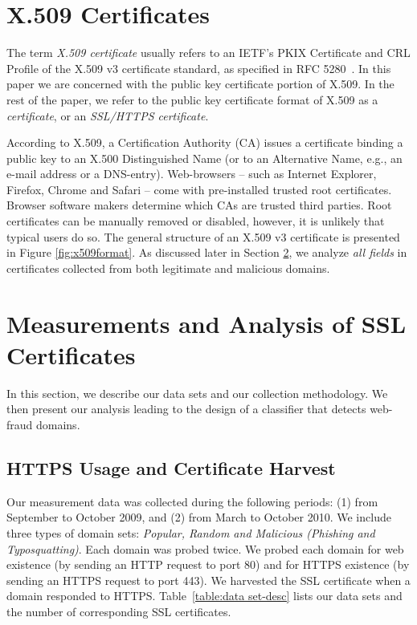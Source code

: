 \documentclass[twocolumn]{article}
\begin{document}
\section{X.509 Certificates}\label{sec:x509}The term {\em X.509 certificate} usually refers to 
an IETF's PKIX Certificate and CRL Profile of the X.509 v3 certificate standard, as 
specified in RFC 5280~\cite{x509rfc}. In this paper we are concerned with the public key 
certificate portion of X.509. In the rest of the paper, we refer to the public key certificate 
format of X.509 as a {\em certificate}, or an {\em SSL/HTTPS certificate}. 

According to X.509, a Certification Authority (CA) issues a certificate binding a public key to an X.500
Distinguished Name (or to an Alternative Name, e.g., an e-mail address or a DNS-entry). 
Web-browsers -- such as Internet Explorer, Firefox, Chrome and Safari -- come 
with pre-installed trusted root certificates. Browser software makers determine which 
CAs are trusted third parties. Root certificates can be 
manually removed or disabled, however, it is unlikely that typical users do so. 
The general structure of an X.509 v3 \cite{x509rfc} certificate is presented in Figure 
\ref{fig:x509format}. As discussed later in Section \ref{sec:experiments}, 
we analyze \textit{all fields} in certificates collected from both legitimate and malicious domains.


\section{Measurements and Analysis of SSL Certificates}\label{sec:experiments}
In this section, we describe our data sets and our collection methodology. 
We then present our analysis leading to the design of a classifier that detects web-fraud domains. 

\subsection{HTTPS Usage and Certificate Harvest} \label{subsec:method-data-sets}Our measurement data was collected during the following periods: (1) from September to October 2009, and (2) from March to October 2010.
We include three types of domain sets: \textit{Popular, Random and Malicious (Phishing and Typosquatting)}. Each domain
was probed twice. We probed each domain for web existence (by sending an HTTP request to port 80)
and for HTTPS existence (by sending an HTTPS request to port 443). We harvested the SSL certificate when a domain responded to HTTPS. Table~\ref{table:data set-desc} lists our data sets and the number of corresponding SSL certificates.
\end{document}
